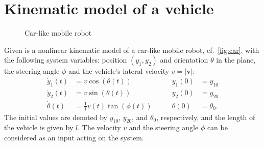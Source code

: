 \documentclass[a4paper,11pt,headinclude=true,headsepline,parskip=half,DIV=13]{scrartcl}
\begin{document}
\section{Kinematic model of a vehicle}
\label{sec:model}
\begin{figure}[ht]
  \centering
  \def\svgwidth{0.7\textwidth}
  
  \caption{Car-like mobile robot}
  \label{fig:car}
\end{figure}
Given is a nonlinear kinematic model of a car-like mobile robot, cf.~\autoref{fig:car}, with the following system variables: position $(y_1, y_2)$ and orientation $\theta$ in the plane, the steering angle $\phi$ and the vehicle's lateral velocity $v=\left| \mathbf{v} \right| $: 
\begin{subequations}\label{eq:syseq}
\begin{alignat}{2}
\dot{y}_1(t)&=v \cos (\theta(t)) &\qquad y_1(0) &= y_{10}\\
\dot{y}_2(t)&=v \sin (\theta(t)) &\qquad y_2(0) &= y_{20}\\
\dot{\theta}(t) &= \frac{1}{l}v(t)\tan(\phi(t)) &\qquad \theta(0) &= \theta_{0}.
\end{alignat}
\end{subequations}
The initial values are denoted by $y_{10}$, $y_{20}$, and $\theta_0$, respectively, and the length of the vehicle is given by $l$. The velocity $v$ and the steering angle $\phi$ can be considered as an input acting on the system.
\end{document}
